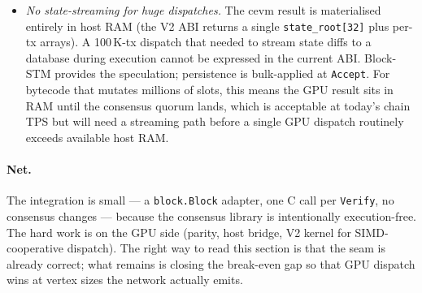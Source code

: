 \begin{itemize}
    Metal, one CPU-Parallel) and produce different roots due to a
    parity bug, only the four-way parity test corpus
    (\texttt{test/parity\_test.cpp}) catches it before deployment.
    Run-time disagreement would surface as a vote split, not a
    halt --- so divergent backends would silently lose finality on
    the affected branch. The fix path is exactly the parity corpus
    discipline: every backend must be byte-equivalent on every
    consensus-critical vector.
  \item \emph{No state-streaming for huge dispatches.} The cevm result
    is materialised entirely in host RAM (the V2 ABI returns a single
    \texttt{state\_root[32]} plus per-tx arrays). A 100\,K-tx dispatch
    that needed to stream state diffs to a database during execution
    cannot be expressed in the current ABI. Block-STM provides the
    speculation; persistence is bulk-applied at \texttt{Accept}. For
    bytecode that mutates millions of slots, this means the GPU result
    sits in RAM until the consensus quorum lands, which is acceptable
    at today's chain TPS but will need a streaming path before
    a single GPU dispatch routinely exceeds available host RAM.
\end{itemize}

\paragraph{Net.} The integration is small --- a \texttt{block.Block}
adapter, one C call per \texttt{Verify}, no consensus changes ---
because the consensus library is intentionally execution-free. The
hard work is on the GPU side (parity, host bridge, V2 kernel for
SIMD-cooperative dispatch). The right way to read this section is
that the seam is already correct; what remains is closing the
break-even gap so that GPU dispatch wins at vertex sizes the network
actually emits.

